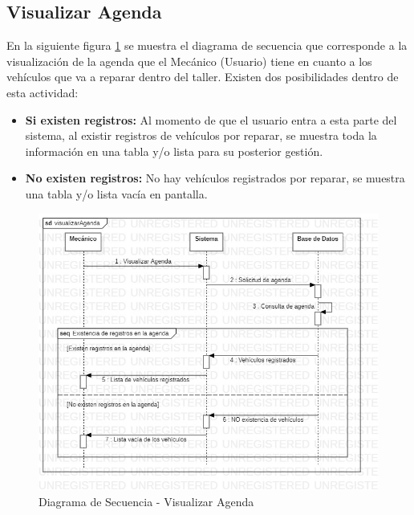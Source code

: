 \subsection{Visualizar Agenda}
En la siguiente figura \ref{fig:Diagrama de Secuencia - Visualizar Agenda} se muestra el diagrama de secuencia que corresponde a la visualización de la agenda que el Mecánico (Usuario) tiene en cuanto a los vehículos que va a reparar dentro del taller. Existen dos posibilidades dentro de esta actividad:
\begin{itemize}
	\item \textbf{Si existen registros:} Al momento de que el usuario entra a esta parte del sistema, al existir registros de vehículos por reparar, se muestra toda la información en una tabla y/o lista para su posterior gestión.  
	\item \textbf{No existen registros:} No hay vehículos registrados por reparar, se muestra una tabla y/o lista vacía en pantalla.
\end{itemize}
\begin{figure}[!h]
	\centering
	\includegraphics[width=1\textwidth]{./diseno/vprocesos/imagenes/visualizarAgenda}
	\caption{Diagrama de Secuencia - Visualizar Agenda}
	\label{fig:Diagrama de Secuencia - Visualizar Agenda}
\end{figure}